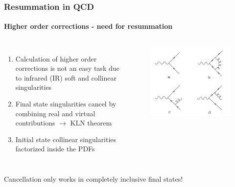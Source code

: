 \documentclass[aspectratio=43]{beamer}
\begin{document}
\begin{frame}

	\frametitle{Resummation in QCD}
	\framesubtitle{Higher order corrections - need for resummation}

	\footnotesize
	
	\begin{columns}
	
	
	\begin{enumerate}
		\item Calculation of higher order corrections is {\color{red}not an easy task} due to {\color{red} infrared (IR) soft and collinear singularities}
		\item Final state singularities {\color{blue}cancel} by combining real and virtual contributions $\longrightarrow$ KLN theorem
		\item Initial state collinear singularities {\color{blue}factorized} inside the PDFs
	\end{enumerate}
	
	\begin{figure}[!htb]
		\includegraphics[width = \linewidth]{plots/part2/qcd_corrections.png}
	\end{figure}
	
	\end{columns}

	\vspace{0.5 cm}
	
	Cancellation only works in completely inclusive final states!

\end{frame}
\end{document}
